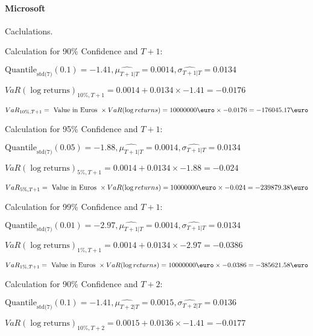 \paragraph{Microsoft} Caclulations.\newline \indent 




Calculation for 90\% Confidence and $T+1$:

\indent\indent $\text{Quantile}_\text{std(7)}(0.1) = -1.41,\hat{\mu_{T+1|T}} = 0.0014, \hat{\sigma_{T+1|T}} = 0.0134$

\indent\indent $VaR(\log \text{returns})_{10\%, T + 1} = 0.0014 + 0.0134\times-1.41 = -0.0176$

\indent\indent $VaR_{10\%, T + 1} = \text{ Value in Euros } \times VaR(\log returns) = 10 000 000 \text{\euro} \times-0.0176 = -176045.17 \text{\euro}$\newline




Calculation for 95\% Confidence and $T+1$:

\indent\indent $\text{Quantile}_\text{std(7)}(0.05) = -1.88,\hat{\mu_{T+1|T}} = 0.0014, \hat{\sigma_{T+1|T}} = 0.0134$

\indent\indent $VaR(\log \text{returns})_{5\%, T + 1} = 0.0014 + 0.0134\times-1.88 = -0.024$

\indent\indent $VaR_{5\%, T + 1} = \text{ Value in Euros } \times VaR(\log returns) = 10 000 000 \text{\euro} \times-0.024 = -239879.38 \text{\euro}$\newline




Calculation for 99\% Confidence and $T+1$:

\indent\indent $\text{Quantile}_\text{std(7)}(0.01) = -2.97,\hat{\mu_{T+1|T}} = 0.0014, \hat{\sigma_{T+1|T}} = 0.0134$

\indent\indent $VaR(\log \text{returns})_{1\%, T + 1} = 0.0014 + 0.0134\times-2.97 = -0.0386$

\indent\indent $VaR_{1\%, T + 1} = \text{ Value in Euros } \times VaR(\log returns) = 10 000 000 \text{\euro} \times-0.0386 = -385621.58 \text{\euro}$\newline




Calculation for 90\% Confidence and $T+2$:

\indent\indent $\text{Quantile}_\text{std(7)}(0.1) = -1.41,\hat{\mu_{T+2|T}} = 0.0015, \hat{\sigma_{T+2|T}} = 0.0136$

\indent\indent $VaR(\log \text{returns})_{10\%, T + 2} = 0.0015 + 0.0136\times-1.41 = -0.0177$

